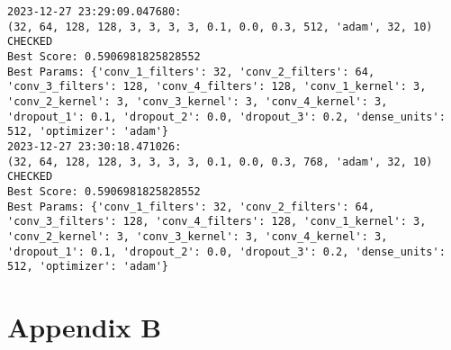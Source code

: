 \begin{verbatim}
2023-12-27 23:29:09.047680:
(32, 64, 128, 128, 3, 3, 3, 3, 0.1, 0.0, 0.3, 512, 'adam', 32, 10) CHECKED
Best Score: 0.5906981825828552
Best Params: {'conv_1_filters': 32, 'conv_2_filters': 64, 'conv_3_filters': 128, 'conv_4_filters': 128, 'conv_1_kernel': 3, 'conv_2_kernel': 3, 'conv_3_kernel': 3, 'conv_4_kernel': 3, 'dropout_1': 0.1, 'dropout_2': 0.0, 'dropout_3': 0.2, 'dense_units': 512, 'optimizer': 'adam'}
2023-12-27 23:30:18.471026:
(32, 64, 128, 128, 3, 3, 3, 3, 0.1, 0.0, 0.3, 768, 'adam', 32, 10) CHECKED
Best Score: 0.5906981825828552
Best Params: {'conv_1_filters': 32, 'conv_2_filters': 64, 'conv_3_filters': 128, 'conv_4_filters': 128, 'conv_1_kernel': 3, 'conv_2_kernel': 3, 'conv_3_kernel': 3, 'conv_4_kernel': 3, 'dropout_1': 0.1, 'dropout_2': 0.0, 'dropout_3': 0.2, 'dense_units': 512, 'optimizer': 'adam'}
\end{verbatim}
\newpage
\section*{Appendix B}
